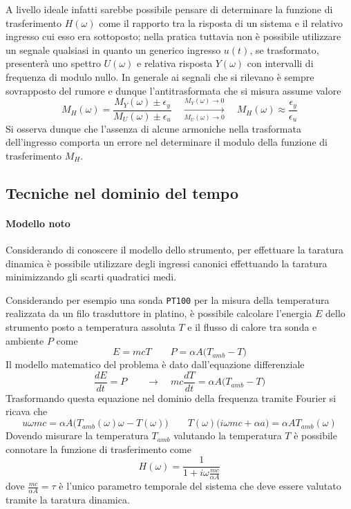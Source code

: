 		A livello ideale infatti sarebbe possibile pensare di determinare la funzione di trasferimento $H(\omega)$ come il rapporto tra la risposta di un sistema e il relativo ingresso cui esso era sottoposto; nella pratica tuttavia non è possibile utilizzare un segnale qualsiasi in quanto un generico ingresso $u(t)$, se trasformato, presenterà uno spettro $U(\omega)$ e relativa risposta $Y(\omega)$ con intervalli di frequenza di modulo nullo. In generale ai segnali che si rilevano è sempre sovrapposto del rumore e dunque l'antitrasformata che si misura assume valore
		\[ M_H(\omega) = \frac{M_Y(\omega) \pm \epsilon_y}{ M_U(\omega) \pm \epsilon_u } \quad \xrightarrow[M_U(\omega)\rightarrow 0]{M_Y(\omega) \rightarrow 0} \quad M_H(\omega) \approx \frac {\epsilon_y}{\epsilon_u} \]
		Si osserva dunque che l'assenza di alcune armoniche nella trasformata dell'ingresso comporta un errore nel determinare il modulo della funzione di trasferimento $M_H$.		
	
	\subsection{Tecniche nel dominio del tempo}
		
	
	
	\paragraph{Modello noto} Considerando di conoscere il modello dello strumento, per effettuare la taratura dinamica è possibile utilizzare degli ingressi canonici effettuando la taratura minimizzando gli scarti quadratici medi.
	
	Considerando per esempio una sonda \texttt{PT100} per la misura della temperatura realizzata da un filo trasduttore in platino, è possibile calcolare l'energia $E$ dello strumento posto a temperatura assoluta $T$ e il flusso di calore tra sonda e ambiente $P$ come
	\[E=mc T \qquad P = \alpha A \big(T_{amb} - T\big) \]
	Il modello matematico del problema è dato dall'equazione differenziale
	\[ \frac{dE}{dt} = P \qquad \rightarrow \quad mc \frac {dT}{dt} = \alpha A \big(T_{amb} - T \big)  \]
	Trasformando questa equazione nel dominio della frequenza tramite Fourier si ricava che
	\[ u\omega m c = \alpha A \big(T_{amb}(\omega) \omega -T(\omega)\big) \qquad T(\omega) \big(i\omega m c + \alpha a\big) = \alpha A T_{amb}(\omega)\]
	Dovendo misurare la temperatura $T_{amb}$ valutando la temperatura $T$ è possibile connotare la funzione di trasferimento come
	\[ H(\omega) = \frac 1 {1 + i\omega \frac{mc}{\alpha A}}\]
	dove $\frac{mc}{\alpha A} = \tau$ è l'unico parametro temporale del sistema che deve essere valutato tramite la taratura dinamica.
	

